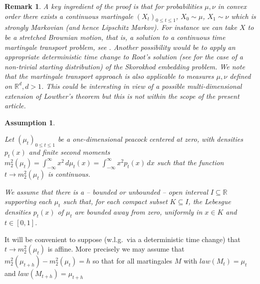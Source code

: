 \documentclass[11pt,a4paper]{article}%
\def\E{{\mathbb E}}
\def\R{{\mathbb R}}
\renewcommand{\subset}{\subseteq}
\newtheorem{assumption}[theorem]{Assumption}
\newtheorem{remark}[theorem]{Remark}
\numberwithin{equation}{section}
\begin{document}
\begin{remark}\label{LMkernelE}
A key ingredient of the proof is that for  probabilities $\mu, \nu$ in convex order there exists a continuous martingale $(X_t)_{0 \le t \le 1}$, $X_0 \sim \mu$, $X_1\sim \nu$  which is strongly Markovian (and hence Lipschitz Markov). For instance we can take $X$ to be a \emph{stretched Brownian motion}, that is, a solution to a continuous time martingale transport problem, see \cite{BaBeHuKa20}. Another possibility would be to apply an appropriate deterministic time change to Root's solution \cite{Ro69} (see \cite{CoWa12} for the case of a non-trivial starting distribution) of the Skorokhod embedding problem. We note that the martingale transport approach is also applicable to measures $\mu, \nu$ defined on $\R^d, d>1$. This could be interesting in view of a possible multi-dimensional  extension of Lowther's theorem but this is not within the scope of the present article.
\end{remark}




\begin{assumption}\label{Ass}

Let $ (\mu_t)_{0 \le t \le 1}$ be a one-dimensional peacock centered at zero, with densities $p_t(x)$ and finite second moments $m^2_2(\mu_t) = \int_{-\infty}^\infty x^2 \, d\mu_t(x) = \int_{-\infty}^\infty x^2 p_t(x)\, dx$ such that the function $ t \to m^2_2(\mu_t)$ is continuous. 

We assume that there is a -- bounded or unbounded -- open interval $I \subset \R$ supporting each $\mu_t$ such that, for each compact subset $ K \subset I$, the Lebesgue densities $p_t(x)$ of $\mu_t$ are bounded away from zero, uniformly in $x \in K$ and $t \in [0,1]$.



\end{assumption}



It will be convenient to suppose (w.l.g.\ via a deterministic time change) that $ t \to m^2_2(\mu_t)$ is affine. More precisely we may assume that $m^2_2(\mu_{t+h}) - m^2_2(\mu_t)= h$ so that for all martingales $M$ with $law( M_t) = \mu_t$ and $law( M_{t+h} )= \mu_{t+h}$
\end{document}
